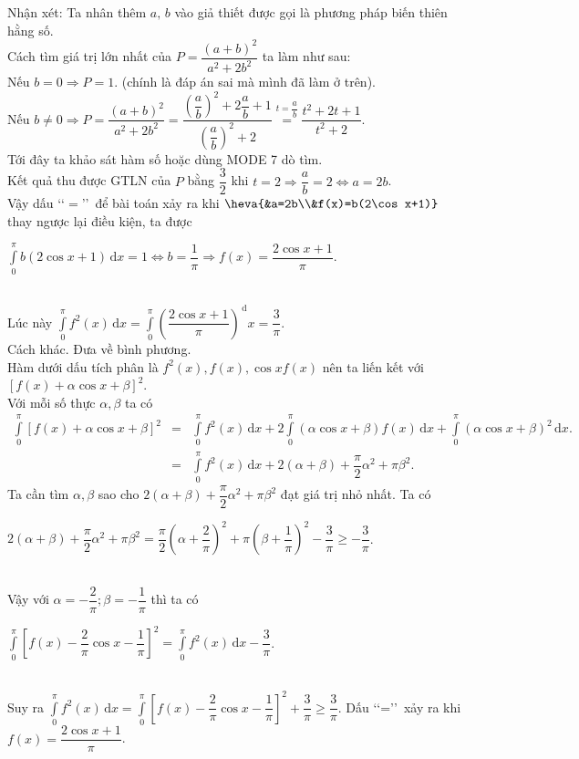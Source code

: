 \begin{ex}
{		Nhận xét: Ta nhân thêm $a,\,b$ vào giả thiết được gọi là phương pháp biến thiên hằng số.\\
		Cách tìm giá trị lớn nhất của $P=\dfrac{(a+b)^2}{a^2+2b^2}$ ta làm như sau:\\
		Nếu $b=0\Rightarrow  P=1$. (chính là đáp án sai mà mình đã làm ở trên).\\
		Nếu $b\neq 0\Rightarrow  P=\dfrac{(a+b)^2}{a^2+2b^2}=\dfrac{\left(\dfrac{a}{b}\right)^2+2\dfrac{a}{b}+1}{\left(\dfrac{a}{b}\right)^2+2}\overset{t=\dfrac{a}{b}}{=}\dfrac{t^2+2t+1}{t^2+2}$.\\ Tới đây ta khảo sát hàm số hoặc dùng MODE 7 dò tìm.\\ Kết quả thu được GTLN của $P$ bằng $\dfrac{3}{2}$ khi $t=2\Rightarrow  \dfrac{a}{b}=2\Leftrightarrow a=2b$.\\
		Vậy dấu \lq\lq$=$\rq\rq\, để bài toán xảy ra khi $\heva{&a=2b\\&f(x)=b(2\cos x+1)}$ thay ngược lại điều kiện, ta được\\
		\centerline{	$\displaystyle\int\limits_0^{\pi} b(2\cos x+1)\mathrm{\,d}x=1\Leftrightarrow b=\dfrac{1}{\pi}\Rightarrow  f(x)=\dfrac{2\cos x+1}{\pi}$.}\\
		Lúc này $\displaystyle\int\limits_0^{\pi} f^2(x)\mathrm{\,d}x=\displaystyle\int\limits_0^{\pi}\left(\dfrac{2\cos x+1}{\pi}\right)^\mathrm{\,d}x=\dfrac{3}{\pi}$.\\
		Cách khác. Đưa về bình phương.\\
		Hàm dưới dấu tích phân là $f^2(x), f(x),\cos xf(x)$ nên ta liến kết với $\left[f(x)+\alpha\cos x+\beta\right]^2$.\\
		Với mỗi số thực $\alpha,\beta$ ta có
		\begin{eqnarray*}
			\displaystyle\int\limits_0^{\pi}\left[f(x)+\alpha\cos x+\beta\right]^2&=&\displaystyle\int\limits_0^{\pi} f^2(x)\mathrm{\,d}x+2\displaystyle\int\limits_0^{\pi}\left(\alpha\cos x+\beta\right)f(x)\mathrm{\,d}x+\displaystyle\int\limits_0^{\pi}\left(\alpha\cos x+\beta\right)^2\mathrm{\,d}x.\\
			&=&\displaystyle\int\limits_0^{\pi} f^2(x)\mathrm{\,d}x+2\left(\alpha+\beta\right)+\dfrac{\pi}{2}\alpha^2+\pi\beta^2.
		\end{eqnarray*}
		Ta cần tìm $\alpha,\beta$ sao cho $2\left(\alpha+\beta\right)+\dfrac{\pi}{2}\alpha^2+\pi\beta^2$ đạt giá trị nhỏ nhất. Ta có\\
		\centerline{	$2\left(\alpha+\beta\right)+\dfrac{\pi}{2}\alpha^2+\pi\beta^2=\dfrac{\pi}{2}\left(\alpha+\dfrac{2}{\pi}\right)^2+\pi\left(\beta+\dfrac{1}{\pi}\right)^2-\dfrac{3}{\pi}\geq-\dfrac{3}{\pi}$.}\\
		Vậy với $\alpha=-\dfrac{2}{\pi};\beta=-\dfrac{1}{\pi}$ thì ta có\\
		\centerline{$\displaystyle\int\limits_0^{\pi}\left[f(x)-\dfrac{2}{\pi}\cos x-\dfrac{1}{\pi}\right]^2=\displaystyle\int\limits_0^{\pi} f^2(x)\mathrm{\,d}x-\dfrac{3}{\pi}$.}\\
		Suy ra $\displaystyle\int\limits_0^{\pi} f^2(x)\mathrm{\,d}x=\displaystyle\int\limits_0^{\pi}\left[f(x)-\dfrac{2}{\pi}\cos x-\dfrac{1}{\pi}\right]^2+\dfrac{3}{\pi}\geq\dfrac{3}{\pi}$. Dấu \lq\lq=\rq\rq\, xảy ra khi $f(x)=\dfrac{2\cos x+1}{\pi}$.}
\end{ex}
